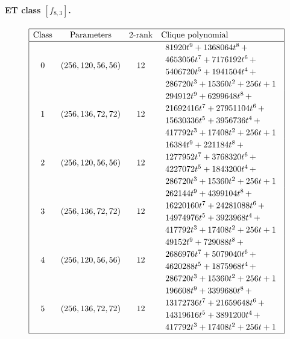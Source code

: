 \documentclass[12pt,a4paper]{article}
\begin{document}
\paragraph*{ET class $[f_{8,3}]$.}

\small{}
\begin{align*}
\def\arraystretch{1.2}
\begin{array}{|cccl|}
\hline
\text{Class} &
\text{Parameters} &
\text{2-rank} &
\text{Clique polynomial}
\\
\hline
0 &
(256, 120, 56, 56) &
12 &
\begin{array}{l}
81920t^{9} + 1368064t^{8}
\,+
\\
 4653056t^{7} + 7176192t^{6}
\,+
\\
 5406720t^{5} + 1941504t^{4}
\,+
\\
 286720t^{3} + 15360t^{2} + 256t + 1
\end{array}
\\
1 &
(256, 136, 72, 72) &
12 &
\begin{array}{l}
294912t^{9} + 6299648t^{8}
\,+
\\
 21692416t^{7} + 27951104t^{6}
\,+
\\
 15630336t^{5} + 3956736t^{4}
\,+
\\
 417792t^{3} + 17408t^{2} + 256t + 1
\end{array}
\\
2 &
(256, 120, 56, 56) &
12 &
\begin{array}{l}
16384t^{9} + 221184t^{8}
\,+
\\
 1277952t^{7} + 3768320t^{6}
\,+
\\
 4227072t^{5} + 1843200t^{4}
\,+
\\
 286720t^{3} + 15360t^{2} + 256t + 1
\end{array}
\\
3 &
(256, 136, 72, 72) &
12 &
\begin{array}{l}
262144t^{9} + 4399104t^{8}
\,+
\\
 16220160t^{7} + 24281088t^{6}
\,+
\\
 14974976t^{5} + 3923968t^{4}
\,+
\\
 417792t^{3} + 17408t^{2} + 256t + 1
\end{array}
\\
4 &
(256, 120, 56, 56) &
12 &
\begin{array}{l}
49152t^{9} + 729088t^{8}
\,+
\\
 2686976t^{7} + 5079040t^{6}
\,+
\\
 4620288t^{5} + 1875968t^{4}
\,+
\\
 286720t^{3} + 15360t^{2} + 256t + 1
\end{array}
\\
5 &
(256, 136, 72, 72) &
12 &
\begin{array}{l}
196608t^{9} + 3399680t^{8}
\,+
\\
 13172736t^{7} + 21659648t^{6}
\,+
\\
 14319616t^{5} + 3891200t^{4}
\,+
\\
 417792t^{3} + 17408t^{2} + 256t + 1
\end{array}
\\
\hline
\end{array}
\end{align*}
\end{document}
